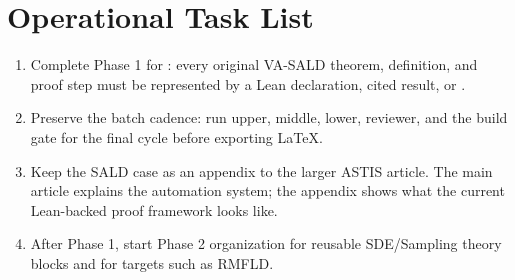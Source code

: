 \section{Operational Task List}

\begin{enumerate}
\item Complete Phase 1 for : every original VA-SALD
      theorem, definition, and proof step must be represented by a Lean
      declaration, cited result, or \ProofObligation{}.
\item Preserve the batch cadence: run upper, middle, lower, reviewer, and the
      build gate for the final cycle before exporting LaTeX.
\item Keep the SALD case as an appendix to the larger ASTIS article.  The main
      article explains the automation system; the appendix shows what the
      current Lean-backed proof framework looks like.
\item After Phase 1, start Phase 2 organization for reusable SDE/Sampling
      theory blocks and for  targets such as RMFLD.
\end{enumerate}
